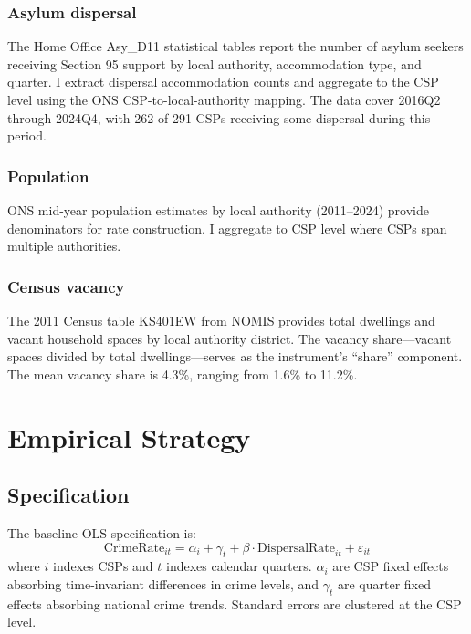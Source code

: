 \documentclass[12pt]{article}
\begin{document}
\subsubsection*{Asylum dispersal} The Home Office Asy\_D11 statistical tables report the number of asylum seekers receiving Section 95 support by local authority, accommodation type, and quarter. I extract dispersal accommodation counts and aggregate to the CSP level using the ONS CSP-to-local-authority mapping. The data cover 2016Q2 through 2024Q4, with 262 of 291 CSPs receiving some dispersal during this period.

\subsubsection*{Population} ONS mid-year population estimates by local authority (2011--2024) provide denominators for rate construction. I aggregate to CSP level where CSPs span multiple authorities.

\subsubsection*{Census vacancy} The 2011 Census table KS401EW from NOMIS provides total dwellings and vacant household spaces by local authority district. The vacancy share---vacant spaces divided by total dwellings---serves as the instrument's ``share'' component. The mean vacancy share is 4.3\%, ranging from 1.6\% to 11.2\%.




\section{Empirical Strategy}

\subsection{Specification}

The baseline OLS specification is:
\begin{equation}
\text{CrimeRate}_{it} = \alpha_i + \gamma_t + \beta \cdot \text{DispersalRate}_{it} + \varepsilon_{it}
\label{eq:ols}
\end{equation}
where $i$ indexes CSPs and $t$ indexes calendar quarters. $\alpha_i$ are CSP fixed effects absorbing time-invariant differences in crime levels, and $\gamma_t$ are quarter fixed effects absorbing national crime trends. Standard errors are clustered at the CSP level.
\end{document}
